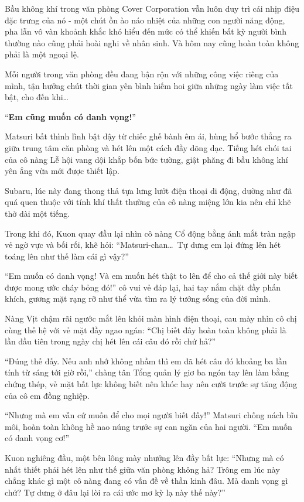 \documentclass[../main.tex]{subfiles}
\begin{document}
Bầu không khí trong văn phòng Cover Corporation vẫn luôn duy trì cái nhịp điệu đặc trưng của nó - một chút ồn ào náo nhiệt của những con người năng động, pha lẫn vô vàn khoảnh khắc khó hiểu đến mức có thể khiến bất kỳ người bình thường nào cũng phải hoài nghi về nhân sinh. Và hôm nay cũng hoàn toàn không phải là một ngoại lệ.

Mỗi người trong văn phòng đều đang bận rộn với những công việc riêng của mình, tận hưởng chút thời gian yên bình hiếm hoi giữa những ngày làm việc tất bật, cho đến khi\dots


``\textbf{Em cũng muốn có danh vọng!}''

Matsuri bất thình lình bật dậy từ chiếc ghế bành êm ái, hùng hổ bước thẳng ra giữa trung tâm căn phòng và hét lên một cách đầy dõng dạc. Tiếng hét chói tai của cô nàng Lễ hội vang dội khắp bốn bức tường, giật phăng đi bầu không khí yên ắng vừa mới được thiết lập.

Subaru, lúc này đang thong thả tựa lưng lướt điện thoại di động, dường như đã quá quen thuộc với tính khí thất thường của cô nàng miệng lớn kia nên chỉ khẽ thở dài một tiếng.

Trong khi đó, Kuon quay đầu lại nhìn cô nàng Cổ động bằng ánh mắt tràn ngập vẻ ngờ vực và bối rối, khẽ hỏi: ``Matsuri-chan\dots\ Tự dưng em lại đứng lên hét toáng lên như thế làm cái gì vậy?''

``Em muốn có danh vọng! Và em muốn hét thật to lên để cho cả thế giới này biết được mong ước cháy bỏng đó!'' cô vui vẻ đáp lại, hai tay nắm chặt đầy phấn khích, gương mặt rạng rỡ như thể vừa tìm ra lý tưởng sống của đời mình.

Nàng Vịt chậm rãi ngước mắt lên khỏi màn hình điện thoại, cau mày nhìn cô chị cùng thế hệ với vẻ mặt đầy ngao ngán: ``Chị biết đây hoàn toàn không phải là lần đầu tiên trong ngày chị hét lên cái câu đó rồi chứ hả?''

``Đúng thế đấy. Nếu anh nhớ không nhầm thì em đã hét câu đó khoảng ba lần tính từ sáng tới giờ rồi,'' chàng tân Tổng quản lý giơ ba ngón tay lên làm bằng chứng thép, vẻ mặt bất lực không biết nên khóc hay nên cười trước sự tăng động của cô em đồng nghiệp.

``Nhưng mà em vẫn cứ muốn để cho mọi người biết đấy!'' Matsuri chống nách bĩu môi, hoàn toàn không hề nao núng trước sự can ngăn của hai người. ``Em muốn có danh vọng cơ!''

Kuon nghiêng đầu, một bên lông mày nhướng lên đầy bất lực: ``Nhưng mà có nhất thiết phải hét lên như thế giữa văn phòng không hả? Trông em lúc này chẳng khác gì một cô nàng đang có vấn đề về thần kinh đâu. Mà danh vọng gì chứ? Tự dưng ở đâu lại lòi ra cái ước mơ kỳ lạ này thế này?''
\end{document}
